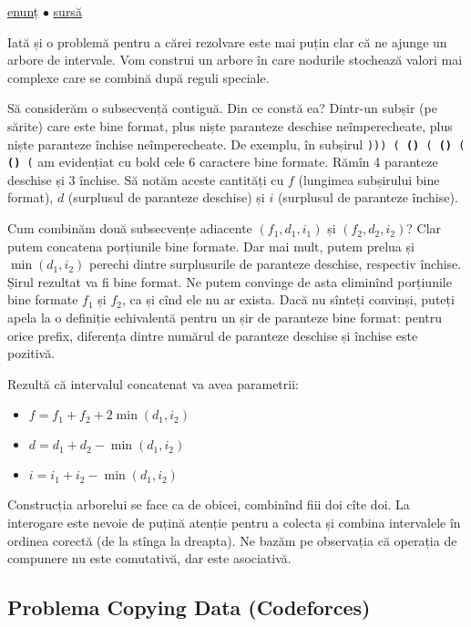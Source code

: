 \href{https://codeforces.com/contest/380/problem/C}{enunț}
$\bullet$
\hyperref[code:sereja-and-brackets]{sursă}

Iată și o problemă pentru a cărei rezolvare este mai puțin clar că ne ajunge un arbore de intervale. Vom construi un arbore în care nodurile stochează valori mai complexe care se combină după reguli speciale.

Să considerăm o subsecvență contiguă. Din ce constă ea? Dintr-un subșir (pe sărite) care este bine format, plus niște paranteze deschise neîmperecheate, plus niște paranteze închise neîmperecheate. De exemplu, în subșirul \texttt{))) ( \textbf{()} ( \textbf{()} ( \textbf{()} (} am evidențiat cu bold cele 6 caractere bine formate. Rămîn 4 paranteze deschise și 3 închise. Să notăm aceste cantități cu $f$ (lungimea subșirului bine format), $d$ (surplusul de paranteze deschise) și $i$ (surplusul de paranteze închise).

Cum combinăm două subsecvențe adiacente $(f_1, d_1, i_1)$ și $(f_2, d_2, i_2)$? Clar putem concatena porțiunile bine formate. Dar mai mult, putem prelua și $\min(d_1, i_2)$ perechi dintre surplusurile de paranteze deschise, respectiv închise. Șirul rezultat va fi bine format. Ne putem convinge de asta eliminînd porțiunile bine formate $f_1$ și $f_2$, ca și cînd ele nu ar exista. Dacă nu sînteți convinși, puteți apela la o definiție echivalentă pentru un șir de paranteze bine format: pentru orice prefix, diferența dintre numărul de paranteze deschise și închise este pozitivă.

Rezultă că intervalul concatenat va avea parametrii:


\begin{itemize}
  \item $f = f_1 + f_2 + 2 \min(d_1, i_2)$
  \item $d = d_1 + d_2 - \min(d_1, i_2)$
  \item $i = i_1 + i_2 - \min(d_1, i_2)$
\end{itemize}

Construcția arborelui se face ca de obicei, combinînd fiii doi cîte doi. La interogare este nevoie de puțină atenție pentru a colecta și combina intervalele în ordinea corectă (de la stînga la dreapta). Ne bazăm pe observația că operația de compunere nu este comutativă, dar este asociativă.

\subsection{Problema Copying Data (Codeforces)}
\label{problem:copying-data}

